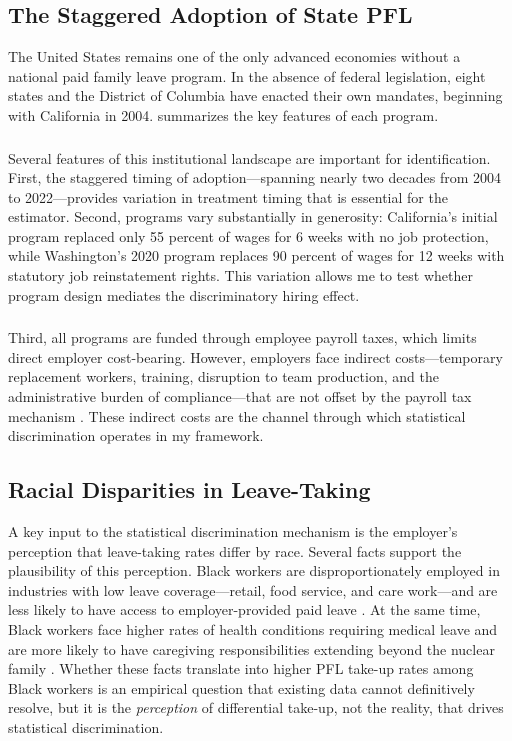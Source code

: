 \documentclass[12pt]{article}
\begin{document}
\subsection{The Staggered Adoption of State PFL}

The United States remains one of the only advanced economies without a national paid family leave program. In the absence of federal legislation, eight states and the District of Columbia have enacted their own mandates, beginning with California in 2004.  summarizes the key features of each program.



\subsubsection*{}
Several features of this institutional landscape are important for identification. First, the staggered timing of adoption---spanning nearly two decades from 2004 to 2022---provides variation in treatment timing that is essential for the \citet{callaway2021} estimator. Second, programs vary substantially in generosity: California's initial program replaced only 55 percent of wages for 6 weeks with no job protection, while Washington's 2020 program replaces 90 percent of wages for 12 weeks with statutory job reinstatement rights. This variation allows me to test whether program design mediates the discriminatory hiring effect.

\subsubsection*{}
Third, all programs are funded through employee payroll taxes, which limits direct employer cost-bearing. However, employers face indirect costs---temporary replacement workers, training, disruption to team production, and the administrative burden of compliance---that are not offset by the payroll tax mechanism \citep{rossinslater2013, baum2016}. These indirect costs are the channel through which statistical discrimination operates in my framework.

\subsection{Racial Disparities in Leave-Taking}

A key input to the statistical discrimination mechanism is the employer's perception that leave-taking rates differ by race. Several facts support the plausibility of this perception. Black workers are disproportionately employed in industries with low leave coverage---retail, food service, and care work---and are less likely to have access to employer-provided paid leave \citep{altonji1999}. At the same time, Black workers face higher rates of health conditions requiring medical leave and are more likely to have caregiving responsibilities extending beyond the nuclear family \citep{charles2008}. Whether these facts translate into higher PFL take-up rates among Black workers is an empirical question that existing data cannot definitively resolve, but it is the \textit{perception} of differential take-up, not the reality, that drives statistical discrimination.
\end{document}
